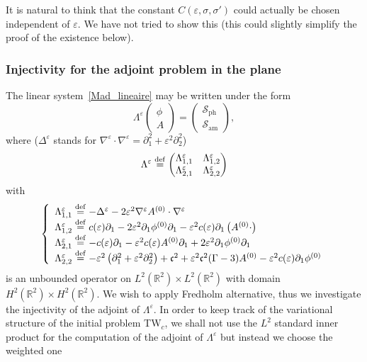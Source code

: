 \documentclass[AHL,Unicode,longabstracts,published]{cedram}
\newcommand*\p{\partial}
\newcommand*\R{\mathbb R}
\newcommand*\ddef{\stackrel{\rm def}{=}}
\newcommand{\amm}{\mathrm{am}}
\newcommand{\phl}{\mathrm{ph}}
\newcommand*\BS{\mathcal{S}}
\newcommand*\cs{{\mathfrak c}}
\newcommand*\e{\varepsilon}
\newcommand*\s{\sigma}
\begin{document}
\begin{rema}
It is natural to think that the constant $ C (\e, \s,\s') $ could actually be chosen independent of $ \e $. We have not tried to show this (this could slightly simplify the proof of the existence below).
\end{rema}



\subsubsection{Injectivity for the adjoint problem in the plane}\label{sec:injectif}

The linear system~\eqref{Mad_lineaire} may be written under the form
\begin{equation*}
\Lambda^\e
\begin{pmatrix}
\phi \\ A
\end{pmatrix} =
\begin{pmatrix} \BS_{\phl} \\ \BS_{\amm}
\end{pmatrix},
\end{equation*}
where ($\Delta^\e $ stands for $ \nabla^\e \cdot \nabla^\e = \p_1^2 + \e^2 \p_2^2 $)
\[
\Lambda^\e
\ddef
\begin{pmatrix}
\Lambda^\e_{1,1} & \Lambda^\e_{1,2} \\
\Lambda^\e_{2,1} & \Lambda^\e_{2,2}
\end{pmatrix}
\]
with
\begin{equation}
\left\{
\begin{array}{ll}
\Lambda^\e_{1,1} \ddef - \Delta^\e - 2 \e^2 \nabla^\e A^{(0)} \cdot \nabla^\e
\\
\Lambda^\e_{1,2} \ddef c(\e) \p_{1} - 2 \e^2 \p_{1} \phi^{(0)} \p_{1} - \e^2 c(\e) \p_1 \left(A^{(0)} \cdot\right)
\\
\Lambda^\e_{2,1} \ddef - c(\e) \p_{1} - \e^2 c(\e) A^{(0)} \p_1 + 2 \e^2 \p_{1} \phi^{(0)} \p_{1}
\\
\Lambda^\e_{2,2} \ddef - \e^2 \left(\p_{1}^2 + \e^2 \p_{2}^2\right) + \cs^2 + \e^2 \cs^2 (\Gamma -3)A^{(0)} - \e^2 c(\e) \p_1 \phi^{(0)}
\end{array}\right.
\end{equation}
is an unbounded operator on $ L^2 (\R^2) \times L^2 (\R^2) $ with domain $ H^2 (\R^2) \times H^2 (\R^2) $. We wish to apply Fredholm alternative, thus we investigate the injectivity of the adjoint of $ \Lambda^\e $. In order to keep track of the variational structure of the initial problem TW$_c $, we shall not use the $L^2 $ standard inner product for the computation of the adjoint of $ \Lambda^\e $ but instead we choose the weighted one
\end{document}
